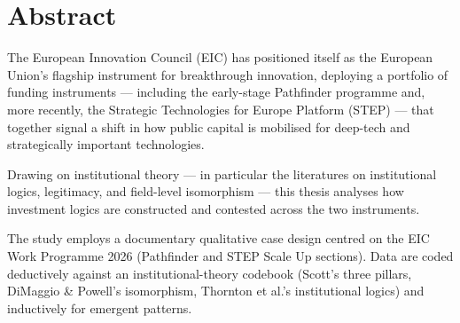 \section*{Abstract}

\noindent
The European Innovation Council (EIC) has positioned itself as the European
Union's flagship instrument for breakthrough innovation, deploying a portfolio
of funding instruments — including the early-stage Pathfinder programme and,
more recently, the Strategic Technologies for Europe Platform (STEP) — that
together signal a shift in how public capital is mobilised for deep-tech and
strategically important technologies.


Drawing on institutional theory — in particular the literatures on
institutional logics, legitimacy, and field-level isomorphism — this thesis
analyses how investment logics are constructed and contested across the two
instruments.

The study employs a documentary qualitative case design centred on the EIC
Work Programme 2026 (Pathfinder and STEP Scale Up sections). Data are coded
deductively against an institutional-theory codebook (Scott's three pillars,
DiMaggio \& Powell's isomorphism, Thornton et al.'s institutional logics) and
inductively for emergent patterns.


